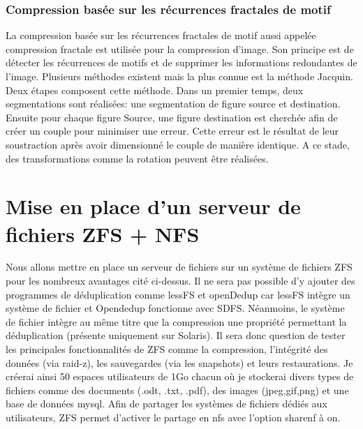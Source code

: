 \documentclass[a4paper]{report}
\begin{document}
	\subsection{Compression basée sur les récurrences fractales de motif}
		La compression basée sur les récurrences fractales de motif aussi appelée compression fractale est utilisée pour la compression d'image. Son principe est de détecter les récurrences de motifs et de supprimer les informations redondantes de l'image. Plusieurs méthodes existent mais la plus connue est la méthode Jacquin. Deux étapes composent cette méthode. Dans un premier temps, deux segmentations sont réalisées: une segmentation de figure source et destination. Ensuite pour chaque figure Source, une figure destination est cherchée afin de créer un couple pour minimiser une erreur. Cette erreur est le résultat de leur soustraction après avoir dimensionné le couple de manière identique. A ce stade, des transformations comme la rotation peuvent être réalisées.
		
         \chapter{Mise en place d'un serveur de fichiers ZFS + NFS}
		Nous allons mettre en place un serveur de fichiers sur un système de fichiers ZFS pour les nombreux avantages cité ci-dessus. Il ne sera pas possible d'y ajouter des programmes de déduplication comme lessFS et openDedup car lessFS intègre un système de fichier et Opendedup fonctionne avec SDFS. Néanmoins, le système de fichier intègre au même titre que la compression une propriété permettant la déduplication (présente uniquement sur Solaris). Il sera donc question de tester les principales fonctionnalités de ZFS comme la compression, l'intégrité des données (via raid-z), les sauvegardes (via les snapshots) et leurs restaurations. Je créerai ainsi 50 espaces utilisateurs de 1Go chacun où je stockerai divers types de fichiers comme des documents (.odt, .txt, .pdf), des images (jpeg,gif,png) et une base de données mysql. Afin de partager les systèmes de fichiers dédiés aux utilisateurs, ZFS permet d'activer le partage en nfs avec l'option sharenf à on.
\end{document}
